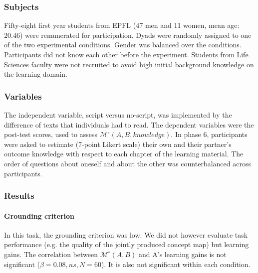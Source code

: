 \documentclass[natbib]{svjour3}
\newcommand{\eg}{e.g.\xspace}
\newcommand{\A}{A\xspace}
\newcommand{\M}[3]{{\mathcal{M}(#1, #2, #3)}}
\newcommand{\Model}[3]{{$\mathcal{M}^{\circ}(#1, #2, #3)$}}
\newcommand{\gModel}[2]{{$\mathcal{M}^{\circ}(#1, #2)$}}
\newcommand{\Mdeg}[3]{{\mathcal{M}^{\circ}(#1, #2, #3)}}
\begin{document}
\subsubsection*{Subjects}

Fifty-eight first year students from EPFL (47 men and 11 women, mean age: 20.46)
were remunerated for participation. Dyads were randomly assigned to one of the
two experimental conditions. Gender was balanced over the conditions.
Participants did not know each other before the experiment. Students from Life
Sciences faculty were not recruited to avoid high initial background knowledge on the
learning domain.

\subsubsection*{Variables}

The independent variable, script versus no-script, was implemented by the
difference of texts that individuals had to read.  The dependent variables were
the post-test scores, used to assess \Model{A}{B}{knowledge}. In phase 6,
participants were asked to estimate (7-point Likert scale) their own and their
partner's outcome knowledge with respect to each chapter of the learning
material. The order of questions about oneself and about the other was
counterbalanced across participants. 
%
%
%

\subsubsection*{Results}

\paragraph{Grounding criterion} In this task, the grounding criterion was low.
We did not however evaluate task performance (\eg the quality of the jointly
produced concept map) but learning gains. The correlation between \gModel{A}{B}
and \A's learning gains is not significant ($\beta = 0.08, ns, N = 60$). It is
also not significant within each condition.
\end{document}

